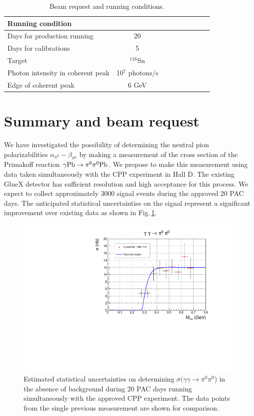 \begin{table}[bt]
\caption{Beam request and running conditions.
\label{request}
}
\begin{center}
\begin{tabular}{|l|c|c|c|c|c|c|c|c|}
\hline
\hline
  Running condition  &            \\ \hline
  Days for production running  &   20   \\ \hline
  Days for calibrations &  5       \\ \hline
  Target   & $^{116}$Sn   \\ \hline
  Photon intensity in coherent peak &   10$^7$ photons/s     \\ \hline
  Edge of coherent peak  &  6 GeV   \\ \hline
 \hline
 \hline
\end{tabular}
\end{center}
\end{table}

\section{Summary and beam request}

We have investigated the possibility of determining the neutral pion
polarizabilities $\alpha_{\pi^0}-\beta_{\pi^0}$ by making a
measurement of the cross section of the Primakoff reaction $\gamma
\rm{Pb}\rightarrow \pi^0 \pi^0 \rm{Pb}$. We propose to make this
measurement using data taken simultaneously with the CPP\cite{CPPexp}
experiment in Hall D. The existing GlueX detector has sufficient
resolution and high acceptance for this process. We expect to collect approximately 3000 signal events during the
approved 20 PAC days. The anticipated statistical uncertainties on
the signal represent a significant improvement over existing data as shown in Fig.\,\ref{fig:sigma_2pi0_figs_4}.

\begin{figure}[tpb]
\centering
\includegraphics[page=4,width=4.75in]{figures/sigma_2pi0_figs.pdf}
\caption{Estimated statistical uncertainties on determining $\sigma(\gamma\gamma\rightarrow\pi^0\pi^0$) in the absence of background during 20 PAC days running simultaneously with the approved CPP experiment. The data points from the single previous measurement
are shown for comparison.
\label{fig:sigma_2pi0_figs_4}}
\end{figure}

